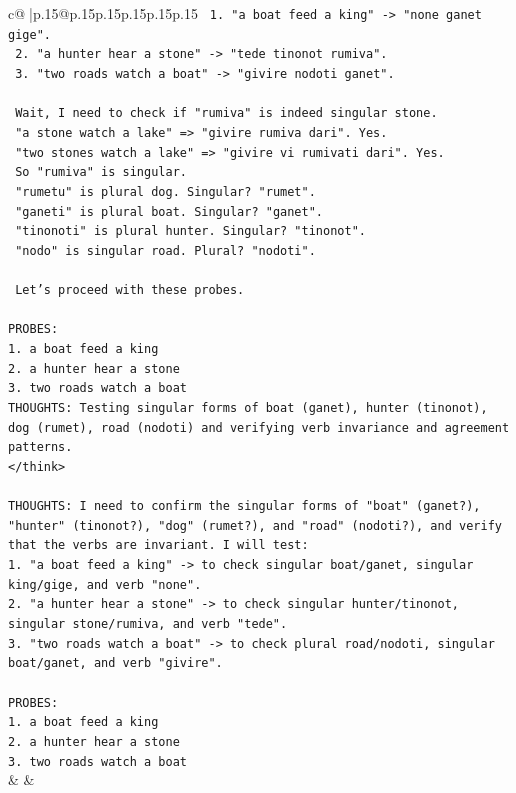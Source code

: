 \documentclass{article}
\begin{document}
{\begin{supertabular}{c@{$\;$}|p{.15\linewidth}@{}p{.15\linewidth}p{.15\linewidth}p{.15\linewidth}p{.15\linewidth}p{.15\linewidth}}
{{{\texttt{   1. "a boat feed a king" {-}> "none ganet gige".} \\
\texttt{   2. "a hunter hear a stone" {-}> "tede tinonot rumiva".} \\
\texttt{   3. "two roads watch a boat" {-}> "givire nodoti ganet".} \\
\\ 
\texttt{   Wait, I need to check if "rumiva" is indeed singular stone.} \\
\texttt{   "a stone watch a lake" => "givire rumiva dari". Yes.} \\
\texttt{   "two stones watch a lake" => "givire vi rumivati dari". Yes.} \\
\texttt{   So "rumiva" is singular.} \\
\texttt{   "rumetu" is plural dog. Singular? "rumet".} \\
\texttt{   "ganeti" is plural boat. Singular? "ganet".} \\
\texttt{   "tinonoti" is plural hunter. Singular? "tinonot".} \\
\texttt{   "nodo" is singular road. Plural? "nodoti".} \\
\\ 
\texttt{   Let's proceed with these probes.} \\
\\ 
\texttt{PROBES:} \\
\texttt{1. a boat feed a king} \\
\texttt{2. a hunter hear a stone} \\
\texttt{3. two roads watch a boat} \\
\texttt{THOUGHTS: Testing singular forms of boat (ganet), hunter (tinonot), dog (rumet), road (nodoti) and verifying verb invariance and agreement patterns.} \\
\texttt{</think>} \\
\\ 
\texttt{THOUGHTS: I need to confirm the singular forms of "boat" (ganet?), "hunter" (tinonot?), "dog" (rumet?), and "road" (nodoti?), and verify that the verbs are invariant. I will test:} \\
\texttt{1. "a boat feed a king" {-}> to check singular boat/ganet, singular king/gige, and verb "none".} \\
\texttt{2. "a hunter hear a stone" {-}> to check singular hunter/tinonot, singular stone/rumiva, and verb "tede".} \\
\texttt{3. "two roads watch a boat" {-}> to check plural road/nodoti, singular boat/ganet, and verb "givire".} \\
\\ 
\texttt{PROBES:} \\
\texttt{1. a boat feed a king} \\
\texttt{2. a hunter hear a stone} \\
\texttt{3. two roads watch a boat} \\
            }
        }
    }
    & & \\ \\


\end{supertabular}}
\end{document}
